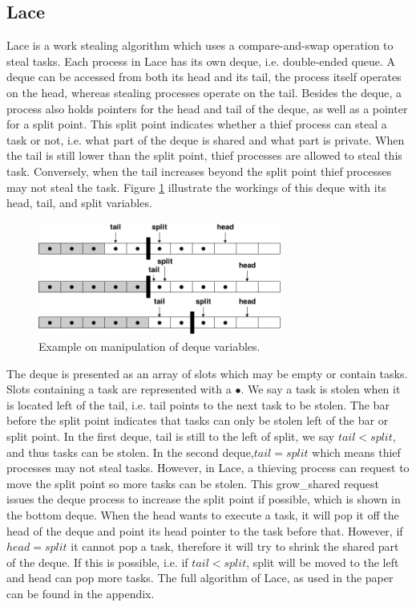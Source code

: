 \documentclass{sig-alternate-br}
\begin{document}
\subsection{Lace}
Lace is a work stealing algorithm\cite{Blumofe1994} which uses a compare-and-swap operation to steal tasks\cite{vanDijk2014206}.
Each process in Lace has its own deque, i.e. double-ended queue. A deque can be accessed from both its head and its tail, the process itself operates on the head, whereas stealing processes operate on the tail.
Besides the deque, a process also holds pointers for the head and tail of the deque, as well as a pointer for a split point.
This split point indicates whether a thief process can steal a task or not, i.e. what part of the deque is shared and what part is private.
When the tail is still lower than the split point, thief processes are allowed to steal this task.
Conversely, when the tail increases beyond the split point thief processes may not steal the task.
Figure \ref{fig:deq} illustrate the workings of this deque with its head, tail, and split variables.
\begin{figure}[h]
	\centering
	\includegraphics[width=8cm]{Lace_Explanation}
	\caption{Example on manipulation of deque variables.}
	\label{fig:deq}
\end{figure}
The deque is presented as an array of slots which may be empty or contain tasks.
Slots containing a task are represented with a $\bullet$.
We say a task is stolen when it is located left of the tail, i.e. tail points to the next task to be stolen.
The bar before the split point indicates that tasks can only be stolen left of the bar or split point.
In the first deque, tail is still to the left of split, we say $tail < split$, and thus tasks can be stolen.
In the second deque,$ tail = split$ which means thief processes may not steal tasks.
However, in Lace, a thieving process can request to move the split point so more tasks can be stolen.
This grow\_shared request issues the deque process to increase the split point if possible, which is shown in the bottom deque.
When the head wants to execute a task, it will pop it off the head of the deque and point its head pointer to the task before that.
However, if $head = split$ it cannot pop a task, therefore it will try to shrink the shared part of the deque.
If this is possible, i.e. if $tail < split$, split will be moved to the left and head can pop more tasks.
The full algorithm of Lace, as used in the paper can be found in the appendix.
\end{document}
